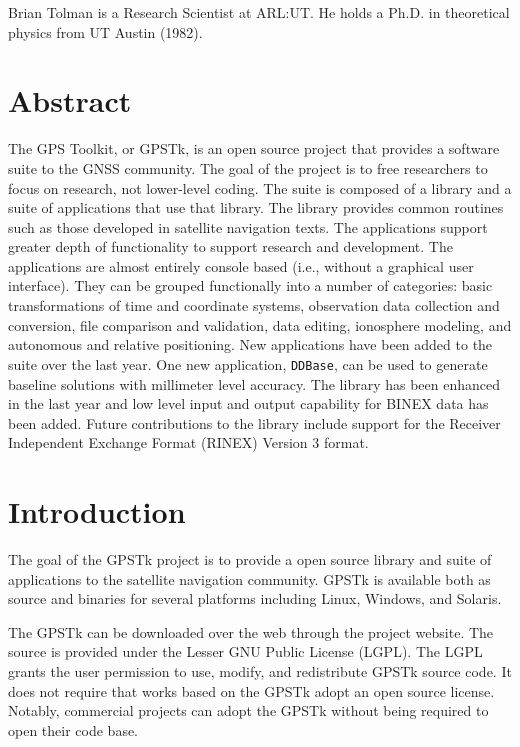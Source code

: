 \documentclass{ion-gps}
\newcommand{\gpstkapplication}[1]{\texttt{#1}}
\begin{document}
Brian Tolman is a Research Scientist at ARL:UT. He holds a
Ph.D. in theoretical physics from UT Austin (1982).

\section*{Abstract}
The GPS Toolkit, or GPSTk, is an open source project that provides a
software suite to the GNSS community. The goal of the project is to
free researchers to focus on research, not lower-level
coding. The suite is composed of a library and a suite of
applications that use that library. The library provides common
routines such as those developed in satellite navigation texts. The
applications support greater depth of functionality to support
research and development. The applications are almost entirely
console based (i.e., without a graphical user interface). They can be
grouped functionally into a number of categories: basic
transformations of time and coordinate systems, observation data
collection and conversion, file comparison and validation, data
editing, ionosphere modeling, and autonomous and relative
positioning. New applications have been added to the suite over the
last year. One new application, \gpstkapplication{DDBase}, can be
used to generate baseline solutions with millimeter level accuracy. The
library has been enhanced in the last year and low level input
and output capability for BINEX data has been added.
Future contributions to the library include support for the
Receiver Independent Exchange Format (RINEX) Version 3 format.

\section*{Introduction}

The goal of the GPSTk project is to provide a
open source library and suite of applications to the satellite
navigation community. GPSTk is available both as source and binaries
for several platforms including Linux, Windows, and Solaris.

The GPSTk can be downloaded over the web through the project
website\cite{gpstkwebsite}. The source is provided under the Lesser
GNU Public License (LGPL). The LGPL grants the user permission to use,
modify, and redistribute GPSTk source code. It does not require that
works based on the GPSTk adopt an open source license. Notably,
commercial projects can adopt the GPSTk without being required to open
their code base.
\end{document}
